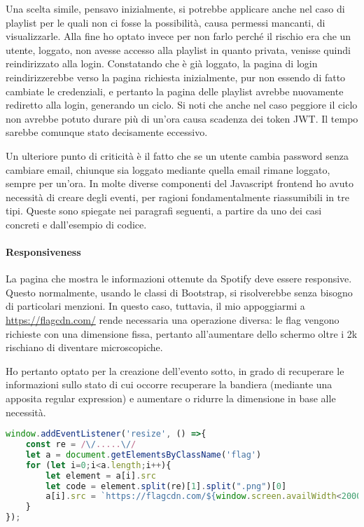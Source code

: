 Una scelta simile, pensavo inizialmente, si potrebbe applicare anche nel caso di playlist per le quali non ci fosse la possibilità, causa permessi mancanti, di visualizzarle. Alla fine ho optato invece per non farlo perché il rischio era che un utente, loggato, non avesse accesso alla playlist in quanto privata, venisse quindi reindirizzato alla login. Constatando che è già loggato, la pagina di login reindirizzerebbe verso la pagina richiesta inizialmente, pur non essendo di fatto cambiate le credenziali, e pertanto la pagina delle playlist avrebbe nuovamente rediretto alla login, generando un ciclo.
\alert{Si noti che anche nel caso peggiore il ciclo non avrebbe potuto durare più di un'ora causa scadenza dei token JWT. Il tempo sarebbe comunque stato decisamente eccessivo.}

\alert{Un ulteriore punto di criticità è il fatto che se un utente cambia password senza cambiare email, chiunque sia loggato mediante quella email rimane loggato, sempre per un'ora.}
In molte diverse componenti del Javascript frontend ho avuto necessità di creare degli eventi, per ragioni fondamentalmente riassumibili in tre tipi. Queste sono spiegate nei paragrafi seguenti, a partire da uno dei casi concreti e dall'esempio di codice.
\paragraph{Responsiveness} La pagina che mostra le informazioni ottenute da Spotify deve essere responsive. Questo normalmente, usando le classi di Bootstrap, si risolverebbe senza bisogno di particolari menzioni. In questo caso, tuttavia, il mio appoggiarmi a \href{https://flagcdn.com/}{https://flagcdn.com/} rende necessaria una operazione diversa: le flag vengono richieste con una dimensione fissa, pertanto all'aumentare dello schermo oltre i 2k rischiano di diventare microscopiche.

Ho pertanto optato per la creazione dell'evento sotto, in grado di recuperare le informazioni sullo stato di cui occorre recuperare la bandiera (mediante una apposita regular expression) e aumentare o ridurre la dimensione in base alle necessità.
\begin{lstlisting}[language=JavaScript]
window.addEventListener('resize', () =>{
    const re = /\/.....\//
    let a = document.getElementsByClassName('flag')
    for (let i=0;i<a.length;i++){
        let element = a[i].src
        let code = element.split(re)[1].split(".png")[0]
        a[i].src = `https://flagcdn.com/${window.screen.availWidth<2000?"16x12":"64x48"}/${code}.png`
    }
});
\end{lstlisting}
